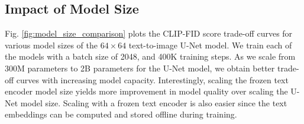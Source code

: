 \subsection{Impact of Model Size}

Fig. \ref{fig:model_size_comparison} plots the CLIP-FID score trade-off curves for various model sizes of the $64\times64$ text-to-image U-Net model. We train each of the models with a batch size of 2048, and 400K training steps. As we scale from 300M parameters to 2B parameters for the U-Net model, we obtain better trade-off curves with increasing model capacity. Interestingly, scaling the frozen text encoder model size yields more improvement in model quality over scaling the U-Net model size. Scaling with a frozen text encoder is also easier since the text embeddings can be computed and stored offline during training.
